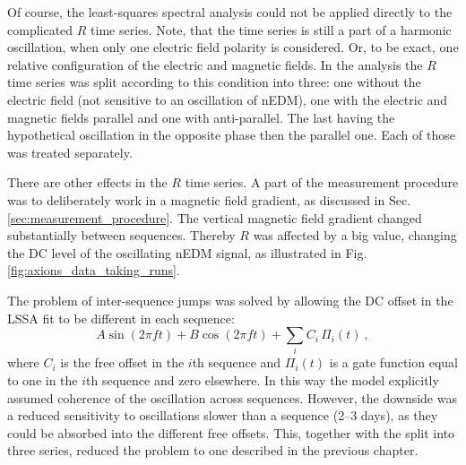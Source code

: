 Of course, the least-squares spectral analysis could not be applied directly to the complicated $R$ time series. Note, that the time series is still a part of a harmonic oscillation, when only one electric field polarity is considered. Or, to be exact, one relative configuration of the electric and magnetic fields. In the analysis the $R$ time series was split according to this condition into three: one without the electric field (not sensitive to an oscillation of nEDM), one with the electric and magnetic fields parallel and one with anti-parallel. The last having the hypothetical oscillation in the opposite phase then the parallel one. Each of those was treated separately.


There are other effects in the $R$ time series. A part of the measurement procedure was to deliberately work in a magnetic field gradient, as discussed in Sec.\,\ref{sec:measurement_procedure}. The vertical magnetic field gradient changed substantially between sequences. Thereby $R$ was affected by a big value, changing the DC level of the oscillating nEDM signal, as illustrated in Fig.\,\ref{fig:axions_data_taking_runs}.

The problem of inter-sequence jumps was solved by allowing the DC offset in the LSSA fit to be different in each sequence:
\begin{equation}
  \label{eq:axions_LSSA}
  A\sin(2 \pi f t) + B\cos(2 \pi f t) + \sum_i C_i\,\Pi_i(t) \ ,
\end{equation}
where $C_i$ is the free offset in the $i$th sequence and $\Pi_i(t)$ is a gate function equal to one in the $i$th sequence and zero elsewhere. In this way the model explicitly assumed coherence of the oscillation across sequences. However, the downside was a reduced sensitivity to oscillations slower than a sequence (2--3 days), as they could be absorbed into the different free offsets. This, together with the split into three series, reduced the problem to one described in the previous chapter.


